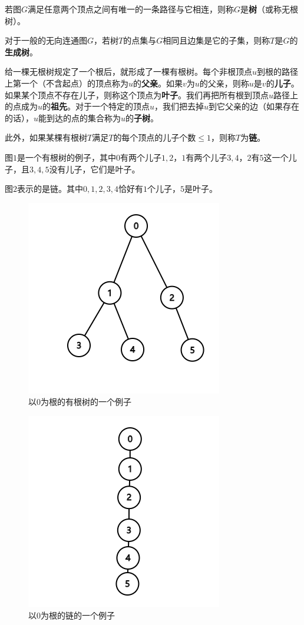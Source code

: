 \documentclass{noithesis}
\begin{document}
若图$G$满足任意两个顶点之间有唯一的一条路径与它相连，则称$G$是\textbf{树}（或称无根树）。

对于一般的无向连通图$G$，若树$T$的点集与$G$相同且边集是它的子集，则称$T$是$G$的\textbf{生成树}。

给一棵无根树规定了一个根后，就形成了一棵有根树。每个非根顶点$u$到根的路径上第一个（不含起点）的顶点称为$u$的\textbf{父亲}。如果$v$为$u$的父亲，则称$u$是$v$的\textbf{儿子}。如果某个顶点不存在儿子，则称这个顶点为\textbf{叶子}。我们再把所有根到顶点$u$路径上的点成为$u$的\textbf{祖先}。对于一个特定的顶点$u$，我们把去掉$u$到它父亲的边（如果存在的话），$u$能到达的点的集合称为$u$的\textbf{子树}。

此外，如果某棵有根树$T$满足$T$的每个顶点的儿子个数$\leq 1$，则称$T$为\textbf{链}。

图$1$是一个有根树的例子，其中$0$有两个儿子$1, 2$，$1$有两个儿子$3, 4$，$2$有$5$这一个儿子，且$3, 4, 5$没有儿子，它们是叶子。

图$2$表示的是链。其中$0, 1, 2, 3, 4$恰好有$1$个儿子，$5$是叶子。

\begin{figure}
\centering
\includegraphics[scale=0.45]{graph2.png}
\caption{以$0$为根的有根树的一个例子}     \label{fig:ss}
\end{figure}

\begin{figure}
\centering
\includegraphics[scale=0.45]{graph4.png}
\caption{以$0$为根的链的一个例子}     \label{fig:ss}
\end{figure}
\end{document}
